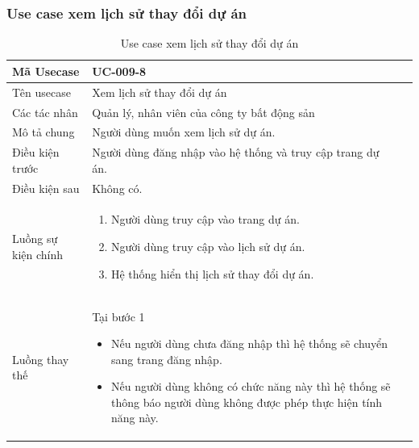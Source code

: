 \documentclass[12pt,a4paper]{article}
\begin{document}
    \subsubsection*{Use case xem lịch sử thay đổi dự án}
    \begin{table}[H]
        \centering
        \begin{tabular}{|p{3.5cm}|p{11.5cm}|c|}
            \hline
            Mã Usecase      & UC-009-8                                                   \\
            \hline
            Tên usecase     & Xem lịch sử thay đổi dự án                                 \\
            \hline
            Các tác nhân    & Quản lý, nhân viên của công ty bất động sản                \\
            \hline
            Mô tả chung     & Người dùng muốn xem lịch sử dự án.                         \\
            \hline

            Điều kiện trước & Người dùng đăng nhập vào hệ thống và truy cập trang dự án. \\
            \hline

            Điều kiện sau   & Không có.                                                  \\
            \hline

            Luồng sự kiện chính & \vspace{-.8cm}\begin{enumerate}
                                                    \item Người dùng truy cập vào trang dự án.
                                                    \item Người dùng truy cập vào lịch sử dự án.
                                                    \item Hệ thống hiển thị lịch sử thay đổi dự án.
            \end{enumerate}
            \\
            \hline
            Luồng thay thế & Tại bước 1\newline
            \vspace{-.8cm}\begin{itemize}
                              \item Nếu người dùng chưa đăng nhập thì hệ thống sẽ chuyển sang trang đăng nhập.
                              \item Nếu người dùng không có chức năng này thì hệ thống sẽ thông báo người dùng không được phép thực hiện tính năng này.
            \end{itemize}
            \\ \hline
        \end{tabular}
        \caption{Use case xem lịch sử thay đổi dự án}

    \end{table}
\end{document}
